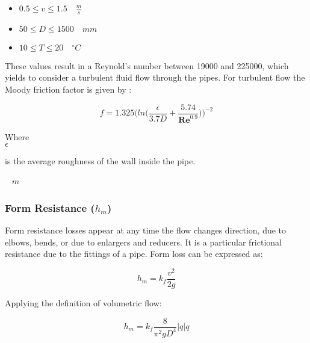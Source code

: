 \begin{itemize}
  \item $0.5 \leq v \leq 1.5  \quad \frac{m}{s}$
  \item $50 \leq D \leq 1500\quad mm$
  \item $10 \leq T \leq 20 \quad ^{\circ} C$
\end{itemize}

These values result in a Reynold's number between 19000 and 225000, which yields to consider a turbulent fluid flow through the pipes. For turbulent flow the 
Moody friction factor is given by \cite{Design_Water}: 

\begin{equation}
  f = 1.325 \bigg(ln\bigg(\frac{\epsilon}{3.7 D}+\frac{5.74}{\pmb{Re}^{0.9}}\bigg)\bigg)^{-2}
  \label{turbulent}
\end{equation}

\begin{minipage}[t]{0.20\textwidth}
Where\\
\hspace*{8mm} $\epsilon$ 
\end{minipage}
\begin{minipage}[t]{0.68\textwidth}
\vspace*{2mm}
is the average roughness of the wall inside the pipe.
 \end{minipage}
\begin{minipage}[t]{0.10\textwidth}
\vspace*{2mm}
\textcolor{White}{te}$\unit{m}$
\end{minipage}

%
\subsubsection{Form Resistance (\texorpdfstring{$h_m$}{})} 
\label{FormResistance}

Form resistance losses appear at any time the flow changes direction, due to elbows, bends,
or due to enlargers and reducers. It is a particular frictional resistance due to the 
fittings of a pipe. Form loss can be expressed as:

\begin{equation}
  h_m = k_f \frac{v^2}{2g}
\end{equation}


Applying the definition of volumetric flow:

\begin{equation}
   h_m = k_f \frac{8}{\pi^2gD^4}  |q| q
\label{Formloss}
\end{equation}

